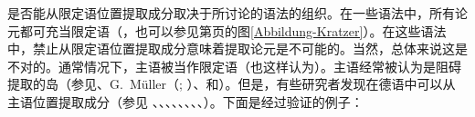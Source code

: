 是否能从限定语位置提取成分取决于所讨论的语法的组织。在一些语法中，所有论元都可充当限定语（\citealp[--123]{Kratzer96a}，也可以参见第\pageref{Abbildung-Kratzer}页的图\ref{Abbildung-Kratzer}）。在这些语法中，禁止从限定语位置提取成分意味着提取论元是不可能的。当然，总体来说这是不对的。通常情况下，主语被当作限定语（\citet[]{FG2002a}也这样认为）。主语经常被认为是阻碍提取的岛（参见\citet[, ]{Grewendorf89a}、G.\ Müller（\citeyear[]{GMueller96b}; \citeyear[, ]{GMueller98a}）、\citet[]{Sabel99a}和\citet[]{Fanselow2001a}）。但是，有些\label{page-extraction-out-of-subjects}研究者发现在德语中可以从主语位置提取成分（参见 \citet[]{Duerscheid89a}、\citet*[]{Haider93a}、\citet{Pafel93b-u}、\citet[]{Fortmann96a-u}、\citet[]{Suchsland97a}、\citet[]{VS98a}、\citet[]{Ballweg97a}、\citet[--101]{Mueller99a}、\citet[]{deKuthy2002a}）。下面是经过验证的例子：
%
